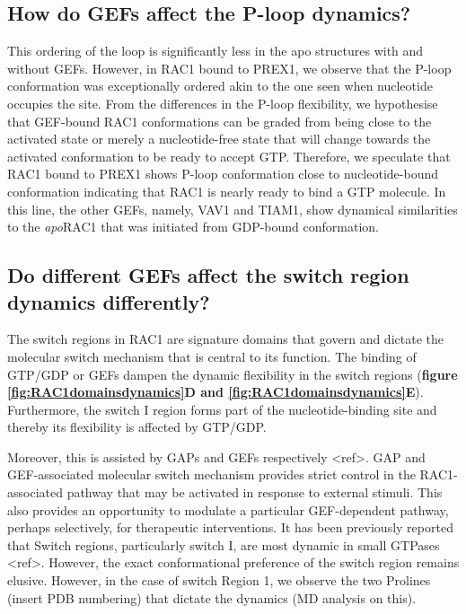 \documentclass[12pt, a4paper]{achemso}
\begin{document}
\subsection{How do GEFs affect the P-loop dynamics?} 
    This ordering of the loop is significantly less in the apo structures with and without GEFs. However, in RAC1 bound to PREX1, we observe that the P-loop conformation was exceptionally ordered akin to the one seen when nucleotide occupies the site. From the differences in the P-loop flexibility, we hypothesise that GEF-bound RAC1 conformations can be graded from being close to the activated state or merely a nucleotide-free state that will change towards the activated conformation to be ready to accept GTP. Therefore, we speculate that RAC1 bound to PREX1 shows P-loop conformation close to nucleotide-bound conformation indicating that RAC1 is nearly ready to bind a GTP molecule. In this line, the other GEFs, namely, VAV1 and TIAM1, show dynamical similarities to the \textit{apo}RAC1 that was initiated from GDP-bound conformation. 

\subsection{Do different GEFs affect the switch region dynamics differently?}
    The switch regions in RAC1 are signature domains that govern and dictate the molecular switch mechanism that is central to its function.  The binding of GTP/GDP or GEFs dampen the dynamic flexibility in the switch regions (\textbf{figure \ref{fig:RAC1domainsdynamics}D and \ref{fig:RAC1domainsdynamics}E}). Furthermore, the switch I region forms part of the nucleotide-binding site and thereby its flexibility is affected by GTP/GDP. 
   
    Moreover, this is assisted by GAPs and GEFs respectively <ref>. GAP and GEF-associated molecular switch mechanism provides strict control in the RAC1-associated pathway that may be activated in response to external stimuli. This also provides an opportunity to modulate a particular GEF-dependent pathway, perhaps selectively, for therapeutic interventions.  It has been previously reported that Switch regions, particularly switch I, are most dynamic in small GTPases <ref>. However, the exact conformational preference of the switch region remains elusive. However, in the case of switch Region 1, we observe the two Prolines (insert PDB numbering) that dictate the dynamics (MD analysis on this). 
    
\end{document}
